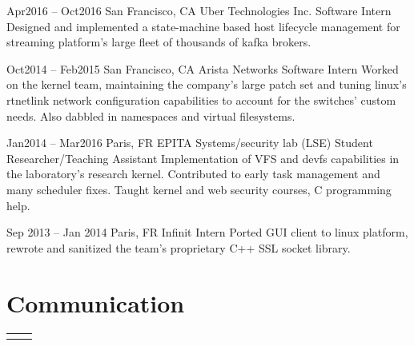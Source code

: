 \documentclass[
	10pt, %
]{freemancv}
\begin{document}
\begin{paracol}{2}
\jobentry
	{Apr2016 -- Oct2016} %
	{San Francisco, CA} %
	{Uber Technologies Inc.} %
	{Software Intern} %
	{
		Designed and implemented a state-machine based host lifecycle
		management for streaming platform's large fleet of thousands of
		kafka brokers.
	}

\jobentry
	{Oct2014 -- Feb2015} %
	{San Francisco, CA} %
	{Arista Networks} %
	{Software Intern} %
	{
		Worked on the kernel team, maintaining the company's large
		patch set and tuning linux's rtnetlink network configuration
		capabilities to account for the switches' custom needs. Also
		dabbled in namespaces and virtual filesystems.
	}

\jobentry
	{Jan2014 -- Mar2016} %
	{Paris, FR} %
	{EPITA Systems/security lab (LSE)} %
	{Student Researcher/Teaching Assistant} %
	{
		Implementation of VFS and devfs capabilities in the
		laboratory's research kernel. Contributed to early task
		management and many scheduler fixes. Taught kernel and web
		security courses, C programming help.
	}

\jobentry
	{Sep 2013 -- Jan 2014} %
	{Paris, FR} %
	{Infinit} %
	{Intern} %
	{
		Ported GUI client to linux platform, rewrote and sanitized the
		team's proprietary C++ SSL socket library.
	}

\section{Communication}
\begin{supertabular}{r l} %
\end{supertabular}
\end{paracol} %
\end{document}
